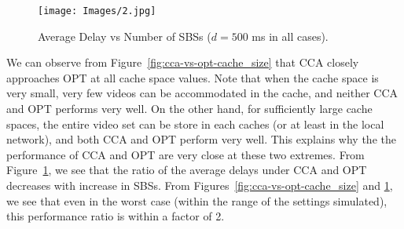 \documentclass[conference]{IEEEtran}
\begin{document}
\begin{figure}[htb]
    \centering
    \vspace{-0.2cm}
    \texttt{[image: Images/2.jpg]}
    \vspace{-0.2cm}
    \caption{Average Delay vs Number of SBSs ($d = 500$ ms in all cases).}
    \vspace{-0.1cm}
    \label{fig:cca-vs-opt-number_of_SBS}
    
\end{figure}

We can observe from Figure~\ref{fig:cca-vs-opt-cache_size} that CCA closely approaches OPT at all cache space values. Note that when the cache space is very small, very few videos can be accommodated in the cache, and neither CCA and OPT performs very well. On the other hand, for sufficiently large cache spaces, the entire video set can be store in each caches (or at least in the local network), and both CCA and OPT perform very well. This explains why the the performance of CCA and OPT are very close at these two extremes. 
From Figure~\ref{fig:cca-vs-opt-number_of_SBS}, we see that the ratio of the average delays under CCA and OPT decreases with increase in SBSs. From Figures~\ref{fig:cca-vs-opt-cache_size} and \ref{fig:cca-vs-opt-number_of_SBS}, we see that even in the worst case (within the range of the settings simulated), this performance ratio is within a factor of 2.




\end{document}
